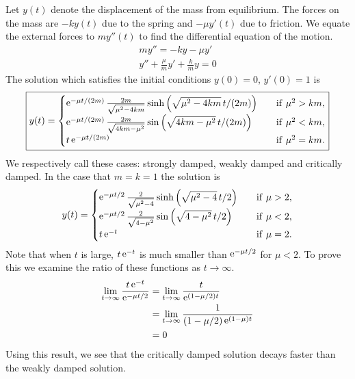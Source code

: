 {%
\begin{Solution}
  \label{solution damped harmonic motion}
  Let $y(t)$ denote the displacement of the mass from equilibrium.  
  The forces on the mass are $-k y(t)$ due to the spring and $- \mu y'(t)$
  due to friction.  We equate the external forces to $m y''(t)$ to find the
  differential equation of the motion.
  \begin{gather*}
    m y'' = - k y - \mu y' \\
    \boxed{
      y'' + \frac{\mu}{m} y' + \frac{k}{m} y = 0
      }
  \end{gather*}
  The solution which satisfies the initial conditions $y(0) = 0$, $y'(0) = 1$ is
  \[
  \boxed{
    y(t) = 
    \begin{cases}
      \mathop{\mathrm{e}}\nolimits^{-\mu t / (2 m)} \frac{2 m}{\sqrt{\mu^2- 4 k m}} 
      \sinh \left( \sqrt{\mu^2 - 4 k m}\, t / (2 m) \right)
      \quad &\mathrm{if}\ \mu^2 > k m, \\
      \mathop{\mathrm{e}}\nolimits^{-\mu t / (2 m)} \frac{2 m}{\sqrt{4 k m - \mu^2}} 
      \sin \left( \sqrt{4 k m - \mu^2}\, t / (2 m) \right)
      \quad &\mathrm{if}\ \mu^2 < k m, \\
      t \mathop{\mathrm{e}}\nolimits^{-\mu t / (2 m)} 
      \quad &\mathrm{if}\ \mu^2 = k m.
    \end{cases}
    }
  \]
  We respectively call these cases: strongly damped, weakly damped and 
  critically damped.  In the case that $m = k = 1$ the solution is
  \[
  y(t) = 
  \begin{cases}
    \mathop{\mathrm{e}}\nolimits^{-\mu t / 2} \frac{2}{\sqrt{\mu^2-4}} 
    \sinh \left( \sqrt{\mu^2 - 4}\, t / 2 \right)
    \quad &\mathrm{if}\ \mu > 2, \\
    \mathop{\mathrm{e}}\nolimits^{-\mu t / 2} \frac{2}{\sqrt{4 - \mu^2}} 
    \sin \left( \sqrt{4 - \mu^2}\, t / 2 \right)
    \quad &\mathrm{if}\ \mu < 2, \\
    t \mathop{\mathrm{e}}\nolimits^{- t} 
    \quad &\mathrm{if}\ \mu = 2.
  \end{cases}
  \]
  Note that when $t$ is large, $t \mathop{\mathrm{e}}\nolimits^{-t}$ is much smaller than 
  $\mathop{\mathrm{e}}\nolimits^{-\mu t / 2}$ for $\mu < 2$.  To prove this we examine the ratio of these
  functions as $t \to \infty$.
  \begin{align*}
    \lim_{t \to \infty} \frac{t \mathop{\mathrm{e}}\nolimits^{-t}}{\mathop{\mathrm{e}}\nolimits^{-\mu t / 2}}
    &= \lim_{t \to \infty} \frac{t}{\mathop{\mathrm{e}}\nolimits^{(1 - \mu / 2) t}} \\
    &= \lim_{t \to \infty} \frac{1}{(1 - \mu / 2) \mathop{\mathrm{e}}\nolimits^{(1 - \mu) t}} \\
    &= 0
  \end{align*}
  Using this result, we see that the critically damped solution decays faster
  than the weakly damped solution.  


\end{Solution}}

